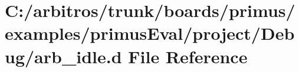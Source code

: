 \hypertarget{boards_2primus_2examples_2primus_eval_2project_2_debug_2arb__idle_8d}{\section{C\-:/arbitros/trunk/boards/primus/examples/primus\-Eval/project/\-Debug/arb\-\_\-idle.d File Reference}
\label{boards_2primus_2examples_2primus_eval_2project_2_debug_2arb__idle_8d}
}
